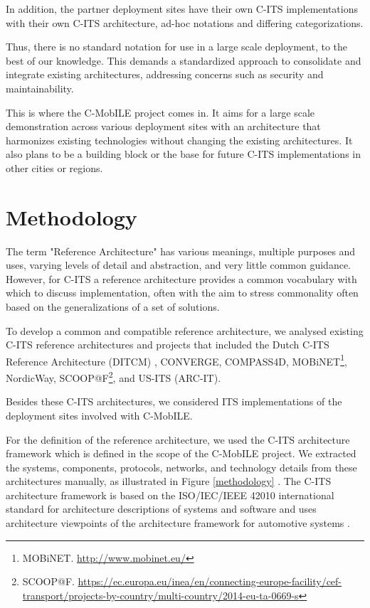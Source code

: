 \documentclass[conference]{IEEEtran}
\begin{document}
In addition, the partner deployment sites have their own C-ITS implementations with their own C-ITS architecture, ad-hoc notations and differing categorizations.

Thus, there is no standard notation for use in a large scale deployment, to the best of our knowledge. This demands a standardized approach to consolidate and integrate existing architectures, addressing concerns such as security and maintainability.

This is where the C-MobILE project comes in. It aims for a large scale demonstration across various deployment sites with an architecture that harmonizes existing technologies without changing the existing architectures. It also plans to be a building block or the base for future C-ITS implementations in other cities or regions.

\section{Methodology}
The term "Reference Architecture" has various meanings, multiple purposes and uses, varying levels of detail and abstraction, and very little common guidance. However, for C-ITS a reference architecture provides a common vocabulary with which to discuss implementation, often with the aim to stress commonality often based on the generalizations of a set of solutions. 

To develop a common and compatible reference architecture, we analysed existing C-ITS reference architectures and projects that included the Dutch C-ITS Reference Architecture (DITCM) \cite{ditcm}\cite{ditcmits}, CONVERGE\footnotemark[\ref{converge}], COMPASS4D\footnotemark[\ref{compass4d}], MOBiNET\footnote{\label{mobinet}MOBiNET. \url{http://www.mobinet.eu/}}, NordicWay\footnotemark[\ref{nordicway}], SCOOP@F\footnote{SCOOP@F. \url{https://ec.europa.eu/inea/en/connecting-europe-facility/cef-transport/projects-by-country/multi-country/2014-eu-ta-0669-s}}, and US-ITS (ARC-IT)\footnotemark[\ref{arcit}].

Besides these C-ITS architectures, we considered ITS implementations of the deployment sites involved with C-MobILE.

For the definition of the reference architecture, we used the C-ITS architecture framework which is defined in the scope of the C-MobILE project. We extracted the systems, components, protocols, networks, and technology details from these architectures manually, as illustrated in Figure \ref{methodology} \cite{d31}.
The C-ITS architecture framework is based on the ISO/IEC/IEEE 42010 \cite{iso42010} international standard for architecture descriptions of systems and software \cite{sysml} and uses architecture viewpoints of the architecture framework for automotive systems \cite{dajsuren2015design}.
\end{document}
